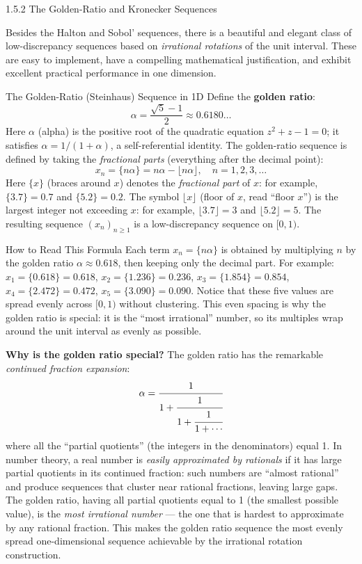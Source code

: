 \documentclass[aspectratio=169,10pt]{beamer}
\begin{document}
\begin{frame}[allowframebreaks]{1.5.2 The Golden-Ratio and Kronecker Sequences}

  Besides the Halton and Sobol' sequences, there is a beautiful and elegant
  class of low-discrepancy sequences based on \emph{irrational rotations} of
  the unit interval.  These are easy to implement, have a compelling
  mathematical justification, and exhibit excellent practical performance in
  one dimension.

  \begin{block}{The Golden-Ratio (Steinhaus) Sequence in 1D}
    Define the \textbf{golden ratio}:
    \[
      \alpha = \frac{\sqrt{5}-1}{2} \approx 0.6180\ldots
    \]
    Here $\alpha$ (alpha) is the positive root of the quadratic equation
    $z^2 + z - 1 = 0$; it satisfies $\alpha = 1/(1 + \alpha)$, a
    self-referential identity.  The golden-ratio sequence is defined by taking
    the \emph{fractional parts} (everything after the decimal point):
    \[
      x_n = \{n\alpha\} = n\alpha - \lfloor n\alpha \rfloor,
      \quad n = 1, 2, 3, \ldots
    \]
    Here $\{x\}$ (braces around $x$) denotes the \emph{fractional part} of
    $x$: for example, $\{3.7\} = 0.7$ and $\{5.2\} = 0.2$.  The symbol
    $\lfloor x \rfloor$ (floor of $x$, read ``floor $x$'') is the largest
    integer not exceeding $x$: for example, $\lfloor 3.7 \rfloor = 3$ and
    $\lfloor 5.2 \rfloor = 5$.  The resulting sequence $(x_n)_{n \ge 1}$ is a
    low-discrepancy sequence on $[0,1)$.
  \end{block}

  \begin{alertblock}{How to Read This Formula}
    Each term $x_n = \{n\alpha\}$ is obtained by multiplying $n$ by the golden
    ratio $\alpha \approx 0.618$, then keeping only the decimal part.  For
    example: $x_1 = \{0.618\} = 0.618$, $x_2 = \{1.236\} = 0.236$,
    $x_3 = \{1.854\} = 0.854$, $x_4 = \{2.472\} = 0.472$, $x_5 = \{3.090\}
    = 0.090$.  Notice that these five values are spread evenly across $[0,1)$
    without clustering.  This even spacing is why the golden ratio is special:
    it is the ``most irrational'' number, so its multiples wrap around the
    unit interval as evenly as possible.
  \end{alertblock}

  \textbf{Why is the golden ratio special?}  The golden ratio has the remarkable
  \emph{continued fraction expansion}:
  \[
    \alpha = \cfrac{1}{1 + \cfrac{1}{1 + \cfrac{1}{1 + \cdots}}}
  \]
  where all the ``partial quotients'' (the integers in the denominators) equal 1.
  In number theory, a real number is \emph{easily approximated by rationals} if
  it has large partial quotients in its continued fraction: such numbers are
  ``almost rational'' and produce sequences that cluster near rational fractions,
  leaving large gaps.  The golden ratio, having all partial quotients equal to 1
  (the smallest possible value), is the \emph{most irrational number} --- the
  one that is hardest to approximate by any rational fraction.  This makes the
  golden ratio sequence the most evenly spread one-dimensional sequence
  achievable by the irrational rotation construction.


\end{frame}
\end{document}
